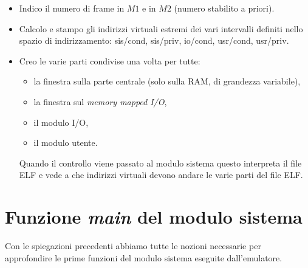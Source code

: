 \documentclass[11pt]{report}
\theoremstyle{definition}
\begin{document}
\begin{itemize}
\begin{center}
	\end{center}
	\begin{itemize}
		\item Indico il numero di frame in $M1$ e in $M2$ (numero stabilito a priori).
		\item Calcolo e stampo gli indirizzi virtuali estremi dei vari intervalli definiti nello spazio di indirizzamento: sis/cond, sis/priv, io/cond, usr/cond, usr/priv.
		\item Creo le varie parti condivise una volta per tutte: 
		\begin{itemize}
			\item la finestra sulla parte centrale (solo sulla RAM, di grandezza variabile),
			\item la finestra sul \emph{memory mapped I/O},
			\item il modulo I/O,
			\item il modulo utente.
		\end{itemize}
		Quando il controllo viene passato al modulo sistema questo interpreta il file ELF e vede a che indirizzi virtuali devono andare le varie parti del file ELF.
	\end{itemize}
\end{itemize} 

\chapter{Funzione \emph{main} del modulo sistema}
Con le spiegazioni precedenti abbiamo tutte le nozioni necessarie per approfondire le prime funzioni del modulo sistema eseguite dall'emulatore.
\end{document}
